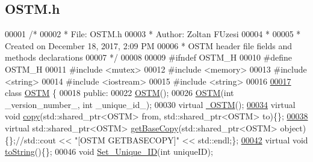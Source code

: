 \hypertarget{_o_s_t_m_8h_source}{}\subsection{O\+S\+T\+M.\+h}

\begin{DoxyCode}
00001 \textcolor{comment}{/* }
00002 \textcolor{comment}{ * File:   OSTM.h}
00003 \textcolor{comment}{ * Author: Zoltan FUzesi}
00004 \textcolor{comment}{ *}
00005 \textcolor{comment}{ * Created on December 18, 2017, 2:09 PM}
00006 \textcolor{comment}{ * OSTM header file fields and  methods declarations}
00007 \textcolor{comment}{ */}
00008 
00009 \textcolor{preprocessor}{#ifndef OSTM\_H}
00010 \textcolor{preprocessor}{#define OSTM\_H}
00011 \textcolor{preprocessor}{#include <mutex>}
00012 \textcolor{preprocessor}{#include <memory>}
00013 \textcolor{preprocessor}{#include <string>}
00014 \textcolor{preprocessor}{#include <iostream>}
00015 \textcolor{preprocessor}{#include <string>}
00016 
\hypertarget{_o_s_t_m_8h_source.tex_l00017}{}\hyperlink{class_o_s_t_m}{00017} \textcolor{keyword}{class }\hyperlink{class_o_s_t_m}{OSTM} \{
00018 \textcolor{keyword}{public}:
00022     \hyperlink{class_o_s_t_m_a968edf778668bd0ec7603f0571619196}{OSTM}();
00026     \hyperlink{class_o_s_t_m_a968edf778668bd0ec7603f0571619196}{OSTM}(\textcolor{keywordtype}{int} \_version\_number\_, \textcolor{keywordtype}{int} \_unique\_id\_);
00030     \textcolor{keyword}{virtual} \hyperlink{class_o_s_t_m_a30a17d73d0259c60eeab72d6dfa9ceb1}{~OSTM}();
\hypertarget{_o_s_t_m_8h_source.tex_l00034}{}\hyperlink{class_o_s_t_m_a535d90fced5adbb70312c92f3778e08d}{00034}     \textcolor{keyword}{virtual} \textcolor{keywordtype}{void} \hyperlink{class_o_s_t_m_a535d90fced5adbb70312c92f3778e08d}{copy}(std::shared\_ptr<OSTM> from, std::shared\_ptr<OSTM> to)\{\};  
\hypertarget{_o_s_t_m_8h_source.tex_l00038}{}\hyperlink{class_o_s_t_m_a0bfa3763bd441407dd6365f42714f94c}{00038}     \textcolor{keyword}{virtual} std::shared\_ptr<OSTM> \hyperlink{class_o_s_t_m_a0bfa3763bd441407dd6365f42714f94c}{getBaseCopy}(std::shared\_ptr<OSTM> \textcolor{keywordtype}{object})\{\};\textcolor{comment}{//std::cout <<
       "[OSTM GETBASECOPY]" << std::endl;\};}
\hypertarget{_o_s_t_m_8h_source.tex_l00042}{}\hyperlink{class_o_s_t_m_a513396a115f2987fd07c203309ae8a59}{00042} \textcolor{comment}{}    \textcolor{keyword}{virtual} \textcolor{keywordtype}{void} \hyperlink{class_o_s_t_m_a513396a115f2987fd07c203309ae8a59}{toString}()\{\};
00046     \textcolor{keywordtype}{void} \hyperlink{class_o_s_t_m_ab5019a32185631c08abbf826422f2d93}{Set\_Unique\_ID}(\textcolor{keywordtype}{int} uniqueID);

\end{DoxyCode}
